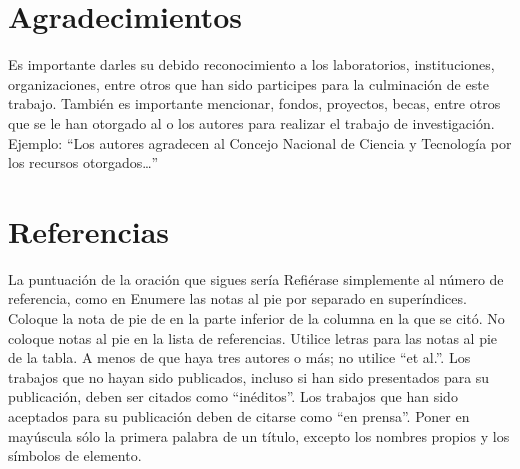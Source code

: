     \section{Agradecimientos}
    
    Es importante darles su debido reconocimiento a los laboratorios, instituciones, organizaciones, entre otros que han sido participes para la culminación de este trabajo. También es importante mencionar, fondos, proyectos, becas, entre otros que se le han otorgado al o los autores para realizar el trabajo de investigación. Ejemplo: “Los autores agradecen al Concejo Nacional de Ciencia y Tecnología por los recursos otorgados…”
    
    \section*{Referencias}
    
    
    
    La puntuación de la oración que sigues sería %
    Refiérase simplemente al número de referencia, como en %
    Enumere las notas al pie por separado en superíndices. Coloque la nota de pie de en la parte inferior de la columna en la que se citó. No coloque notas al pie en la lista de referencias. Utilice letras para las notas al pie de la tabla.
    A menos de que haya tres autores o más; no utilice “et al.”. Los trabajos que no hayan sido publicados, incluso si han sido presentados para su publicación, deben ser citados como “inéditos”. Los trabajos que han sido aceptados para su publicación deben de citarse como “en prensa”. Poner en mayúscula sólo la primera palabra de un título, excepto los nombres propios y los símbolos de elemento. 
    
    

